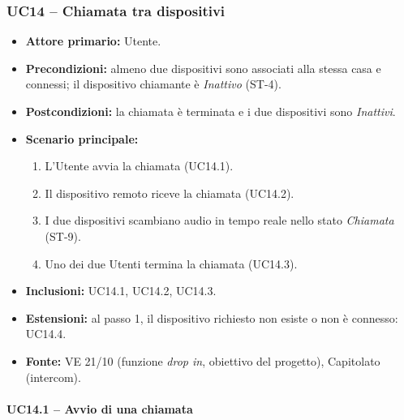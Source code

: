 \documentclass[12pt,a4paper]{article}
\newcommand{\tightlist}{\setlength{\itemsep}{1pt}\setlength{\parskip}{0pt}}
\begin{document}
\subsubsection{UC14 -- Chiamata tra dispositivi}

\begin{itemize}

\tightlist

\item \textbf{Attore primario:} Utente. 

\item \textbf{Precondizioni:} almeno due dispositivi sono associati alla stessa casa e connessi; il dispositivo chiamante è \emph{Inattivo} (ST-4).

\item \textbf{Postcondizioni:} la chiamata è terminata e i due dispositivi sono \emph{Inattivi}.

\item \textbf{Scenario principale:}

\begin{enumerate}

\tightlist

\item L'Utente avvia la chiamata (UC14.1).

\item Il dispositivo remoto riceve la chiamata (UC14.2).

\item I due dispositivi scambiano audio in tempo reale nello stato \emph{Chiamata} (ST-9).

\item Uno dei due Utenti termina la chiamata (UC14.3).

\end{enumerate}

\item \textbf{Inclusioni:} UC14.1, UC14.2, UC14.3.

\item \textbf{Estensioni:} al passo 1, il dispositivo richiesto non esiste o non è connesso: UC14.4.

\item \textbf{Fonte:} VE 21/10 (funzione \emph{drop in}, obiettivo del progetto), Capitolato (intercom).

\end{itemize}



\paragraph{UC14.1 -- Avvio di una chiamata}
\end{document}
